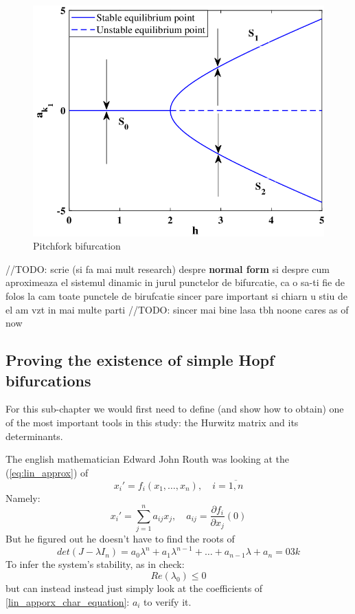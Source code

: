 \begin{figure}[H]
  \includegraphics[width=13cm]{math_pics/pitchfork-photo.png}
  \centering
  \caption{Pitchfork bifurcation}
\end{figure}

//TODO: scrie (si fa mai mult research) despre  \textbf{normal form} si despre cum aproximeaza el sistemul dinamic in jurul punctelor de bifurcatie, ca o sa-ti fie de folos la cam toate punctele de birufcatie sincer pare important si chiarn u stiu de el am vzt in mai multe parti
//TODO: sincer mai bine lasa tbh noone cares as of now

\subsection{Proving the existence of simple Hopf bifurcations}

For this sub-chapter we would first need to define (and show how to obtain) one of the most important tools in this study: the Hurwitz matrix and its determinants.

The english mathematician Edward John Routh was looking at the (\ref{eq:lin_approx}) of
\[
  x_i' = f_i(x_1,\dots , x_n), \quad i = \overline{1,n}
\]
Namely:
\[
  x_i' =\sum_{j=1}^{n}a_{ij} x_j, \quad a_{ij} = \frac{\partial f_i}{\partial x_j}(0)
\]
But he figured out he doesn't have to find the roots of
\begin{equation}\label{lin_apporx_char_equation}
  det(J - \lambda I_n) = a_0 \lambda^n + a_1 \lambda^{n-1} + \dots + a_{n-1}\lambda + a_n = 0
  3k
\end{equation}
To infer the system's stability, as in check:
\[
  Re(\lambda_0) \leq 0
\]
but can instead instead just simply look at the coefficients of \ref{lin_apporx_char_equation}: $a_{i}$ to verify it.

